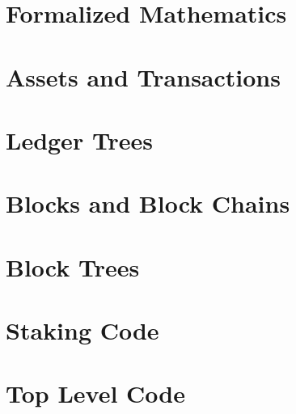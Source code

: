 \documentclass{book}
\begin{document}


\chapter{Formalized Mathematics}\label{chap:math}



\chapter{Assets and Transactions}\label{chap:assetstx}



\chapter{Ledger Trees}\label{chap:ctre}



\chapter{Blocks and Block Chains}\label{chap:block}



\chapter{Block Trees}\label{chap:blocktree}



\chapter{Staking Code}\label{chap:stk}



\chapter{Top Level Code}\label{chap:top}



\printindex



\end{document}
